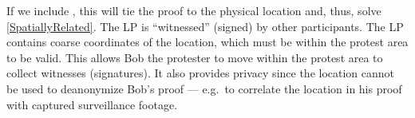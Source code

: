 If we include , this will tie the proof to the physical location and, 
thus, solve \cref{SpatiallyRelated}.
The \ac{LP} is \enquote{witnessed} (signed) by other participants.
The \ac{LP} contains coarse coordinates of the location, which must be within 
the protest area to be valid.
This allows Bob the protester to move within the protest area to collect 
witnesses (signatures).
It also provides privacy since the location cannot be used to deanonymize Bob's 
proof --- e.g.\ to correlate the location in his proof with captured 
surveillance footage.


